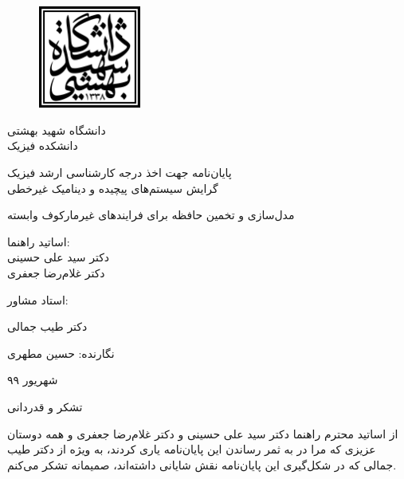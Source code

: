\documentclass[a4paper,titlepage,12pt,fleqn,oneside]{report}
\begin{document}
\newpage
\thispagestyle{empty}
\begin{figure}[h]
\centering
\includegraphics[width=0.3\textwidth]{Logo.pdf}
\end{figure}
\begin{center}
\LARGE{دانشگاه شهید بهشتی}\\
\LARGE{دانشکده فیزیک}\\
\end{center}
\begin{center}
پایان‌نامه جهت اخذ درجه کارشناسی ارشد فیزیک\\
گرایش سیستم‌های پیچیده و دینامیک غیرخطی
\end{center}
\begin{center}
\Huge{مدل‌سازی و تخمین حافظه برای فرایندهای غیرمارکوف وابسته}
\end{center}
\vspace{0.5cm}
\begin{center}
    اساتید راهنما: \\
 دکتر سید علی حسینی\\
دکتر غلام‌رضا جعفری

استاد مشاور:

دکتر طیب جمالی
\end{center}
\begin{center}
نگارنده: حسین مطهری
\end{center}
\vspace{0.5cm}
\begin{center}
شهریور ۹۹
\end{center}


\newpage
\thispagestyle{empty}
تشکر و قدردانی

\vspace{1cm}

از اساتید محترم راهنما دکتر سید علی حسینی و دکتر غلام‌رضا جعفری و همه دوستان عزیزی که مرا در به ثمر رساندن این پایان‌نامه یاری کردند، به ویژه از دکتر طیب جمالی که در شکل‌گیری این پایان‌نامه نقش شایانی داشته‌اند، صمیمانه تشکر می‌کنم.
\newpage

\tableofcontents
\listoffigures
\listoftables
\end{document}
